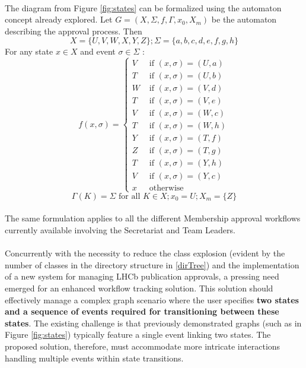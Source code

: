 \paragraph{} The diagram from Figure \ref{fig:states} can be formalized using the automaton concept already explored. Let $ G=\left(X, \Sigma, f, \Gamma, x_0, X_m\right)$ be the automaton describing the approval process. Then 
$$
X=\{U, V, W, X, Y, Z\}; \Sigma=\{a, b, c, d, e, f, g, h\}
$$
For any state $x \in X$ and event $\sigma \in \Sigma$ :
$$
f(x, \sigma)= \begin{cases}V & \text { if }(x, \sigma)=(U, a) \\ T & \text { if }(x, \sigma)=(U, b) \\ W & \text { if }(x, \sigma)=(V, d) \\ T & \text { if }(x, \sigma)=(V, e) \\ V & \text { if }(x, \sigma)=(W, c) \\ T & \text { if }(x, \sigma)=(W, h) \\ Y & \text { if }(x, \sigma)=(T, f) \\ Z & \text { if }(x, \sigma)=(T, g) \\ T & \text { if }(x, \sigma)=(Y, h) \\ V & \text { if }(x, \sigma)=(Y, c) \\ x & \text { otherwise }\end{cases}
$$
$$
\Gamma(K)=\Sigma \text { for all } K \in X; x_0=U; X_m=\{Z\}
$$

\paragraph{} The same formulation applies to all the different Membership approval workflows currently available involving the Secretariat and Team Leaders. 

\paragraph{} Concurrently with the necessity to reduce the class explosion (evident by the number of classes in the directory structure in \ref{dirTree}) and the implementation of a new system for managing LHCb publication approvals, a pressing need emerged for an enhanced workflow tracking solution. This solution should effectively manage a complex graph scenario where the user specifies \textbf{two states and a sequence of events required for transitioning between these states}. The existing challenge is that previously demonstrated graphs (such as in Figure \ref{fig:states}) typically feature a single event linking two states. The proposed solution, therefore, must accommodate more intricate interactions handling multiple events within state transitions.

